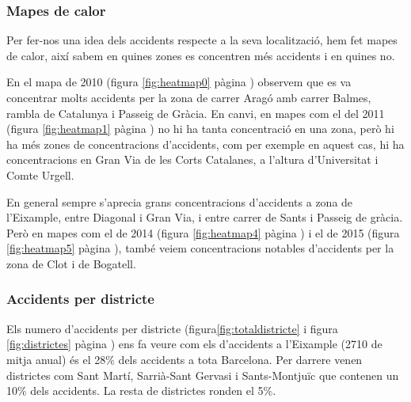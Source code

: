 \subsubsection*{Mapes de calor}

Per fer-nos una idea dels accidents respecte a la seva localització, hem fet mapes de calor, així sabem en quines zones es concentren més accidents i en quines no.

En el mapa de 2010 (figura \ref{fig:heatmap0} pàgina \pageref{fig:heatmap0}) observem que es va concentrar molts accidents per la zona de carrer Aragó amb carrer Balmes, rambla de Catalunya i Passeig de Gràcia. En canvi, en mapes com el del 2011 (figura \ref{fig:heatmap1} pàgina \pageref{fig:heatmap1}) no hi ha tanta concentració en una zona, però hi ha més zones de concentracions d'accidents, com per exemple en aquest cas, hi ha concentracions en Gran Via de les Corts Catalanes, a l'altura d'Universitat i Comte Urgell.

En general sempre s'aprecia grans concentracions d'accidents a zona de l'Eixample, entre Diagonal i Gran Via, i entre carrer de Sants i Passeig de gràcia. Però en mapes com el de 2014 (figura \ref{fig:heatmap4} pàgina \pageref{fig:heatmap4}) i el de 2015 (figura \ref{fig:heatmap5} pàgina \pageref{fig:heatmap5}), també veiem concentracions notables d'accidents per la zona de Clot i de Bogatell.

\subsubsection*{Accidents per districte}

Els numero d'accidents per districte (figura\ref{fig:totaldistricte} i figura \ref{fig:districtes} pàgina \pageref{fig:districtes}) ens fa veure com els d'accidents a l'Eixample (2710 de mitja anual) és el 28\% dels accidents a tota Barcelona. Per darrere venen districtes com Sant Martí, Sarrià-Sant Gervasi i Sants-Montjuïc que contenen un 10\% dels accidents. La resta de districtes ronden el 5\%.

